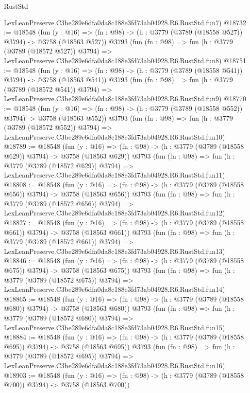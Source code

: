 \begin{lexlean}{RustStd}
\begin{coremodule}
    LexLeanPreserve.C3be289e6dfa0da8c188e3fd73ab04928.R6.RustStd.fun7)
@18732 := @18548
    (fun (y : @16) => (fn : @98) -> (h : @3779 (@3789 (@18558 @527)) @3794) -> @3758 (@18563 @527))
    @3793
    (fun (fn : @98) =>
    fun (h : @3779 (@3789 (@18572 @527)) @3794) =>
    LexLeanPreserve.C3be289e6dfa0da8c188e3fd73ab04928.R6.RustStd.fun8)
@18751 := @18548
    (fun (y : @16) => (fn : @98) -> (h : @3779 (@3789 (@18558 @541)) @3794) -> @3758 (@18563 @541))
    @3793
    (fun (fn : @98) =>
    fun (h : @3779 (@3789 (@18572 @541)) @3794) =>
    LexLeanPreserve.C3be289e6dfa0da8c188e3fd73ab04928.R6.RustStd.fun9)
@18770 := @18548
    (fun (y : @16) => (fn : @98) -> (h : @3779 (@3789 (@18558 @552)) @3794) -> @3758 (@18563 @552))
    @3793
    (fun (fn : @98) =>
    fun (h : @3779 (@3789 (@18572 @552)) @3794) =>
    LexLeanPreserve.C3be289e6dfa0da8c188e3fd73ab04928.R6.RustStd.fun10)
@18789 := @18548
    (fun (y : @16) => (fn : @98) -> (h : @3779 (@3789 (@18558 @629)) @3794) -> @3758 (@18563 @629))
    @3793
    (fun (fn : @98) =>
    fun (h : @3779 (@3789 (@18572 @629)) @3794) =>
    LexLeanPreserve.C3be289e6dfa0da8c188e3fd73ab04928.R6.RustStd.fun11)
@18808 := @18548
    (fun (y : @16) => (fn : @98) -> (h : @3779 (@3789 (@18558 @656)) @3794) -> @3758 (@18563 @656))
    @3793
    (fun (fn : @98) =>
    fun (h : @3779 (@3789 (@18572 @656)) @3794) =>
    LexLeanPreserve.C3be289e6dfa0da8c188e3fd73ab04928.R6.RustStd.fun12)
@18827 := @18548
    (fun (y : @16) => (fn : @98) -> (h : @3779 (@3789 (@18558 @661)) @3794) -> @3758 (@18563 @661))
    @3793
    (fun (fn : @98) =>
    fun (h : @3779 (@3789 (@18572 @661)) @3794) =>
    LexLeanPreserve.C3be289e6dfa0da8c188e3fd73ab04928.R6.RustStd.fun13)
@18846 := @18548
    (fun (y : @16) => (fn : @98) -> (h : @3779 (@3789 (@18558 @675)) @3794) -> @3758 (@18563 @675))
    @3793
    (fun (fn : @98) =>
    fun (h : @3779 (@3789 (@18572 @675)) @3794) =>
    LexLeanPreserve.C3be289e6dfa0da8c188e3fd73ab04928.R6.RustStd.fun14)
@18865 := @18548
    (fun (y : @16) => (fn : @98) -> (h : @3779 (@3789 (@18558 @680)) @3794) -> @3758 (@18563 @680))
    @3793
    (fun (fn : @98) =>
    fun (h : @3779 (@3789 (@18572 @680)) @3794) =>
    LexLeanPreserve.C3be289e6dfa0da8c188e3fd73ab04928.R6.RustStd.fun15)
@18884 := @18548
    (fun (y : @16) => (fn : @98) -> (h : @3779 (@3789 (@18558 @695)) @3794) -> @3758 (@18563 @695))
    @3793
    (fun (fn : @98) =>
    fun (h : @3779 (@3789 (@18572 @695)) @3794) =>
    LexLeanPreserve.C3be289e6dfa0da8c188e3fd73ab04928.R6.RustStd.fun16)
@18903 := @18548
    (fun (y : @16) => (fn : @98) -> (h : @3779 (@3789 (@18558 @700)) @3794) -> @3758 (@18563 @700))

\end{coremodule}
\end{lexlean}
